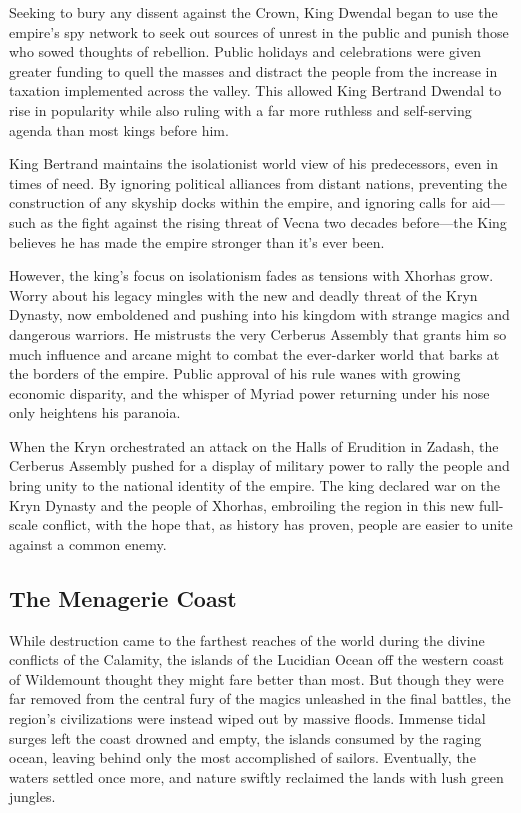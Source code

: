 \documentclass[10pt,a4paper,twoside,bg=print,twocolumn,openany,nodeprecatedcode]{dndbook}
\begin{document}
Seeking to bury any dissent against the Crown, King Dwendal began to use the empire's spy network to seek out sources of unrest in the public and punish those who sowed thoughts of rebellion. Public holidays and celebrations were given greater funding to quell the masses and distract the people from the increase in taxation implemented across the valley. This allowed King Bertrand Dwendal to rise in popularity while also ruling with a far more ruthless and self-serving agenda than most kings before him.

King Bertrand maintains the isolationist world view of his predecessors, even in times of need. By ignoring political alliances from distant nations, preventing the construction of any skyship docks within the empire, and ignoring calls for aid—such as the fight against the rising threat of Vecna two decades before—the King believes he has made the empire stronger than it's ever been.

However, the king's focus on isolationism fades as tensions with Xhorhas grow. Worry about his legacy mingles with the new and deadly threat of the Kryn Dynasty, now emboldened and pushing into his kingdom with strange magics and dangerous warriors. He mistrusts the very Cerberus Assembly that grants him so much influence and arcane might to combat the ever-darker world that barks at the borders of the empire. Public approval of his rule wanes with growing economic disparity, and the whisper of Myriad power returning under his nose only heightens his paranoia.

When the Kryn orchestrated an attack on the Halls of Erudition in Zadash, the Cerberus Assembly pushed for a display of military power to rally the people and bring unity to the national identity of the empire. The king declared war on the Kryn Dynasty and the people of Xhorhas, embroiling the region in this new full-scale conflict, with the hope that, as history has proven, people are easier to unite against a common enemy.

\subsection{The Menagerie Coast}
While destruction came to the farthest reaches of the world during the divine conflicts of the Calamity, the islands of the Lucidian Ocean off the western coast of Wildemount thought they might fare better than most. But though they were far removed from the central fury of the magics unleashed in the final battles, the region's civilizations were instead wiped out by massive floods. Immense tidal surges left the coast drowned and empty, the islands consumed by the raging ocean, leaving behind only the most accomplished of sailors. Eventually, the waters settled once more, and nature swiftly reclaimed the lands with lush green jungles.
\end{document}
